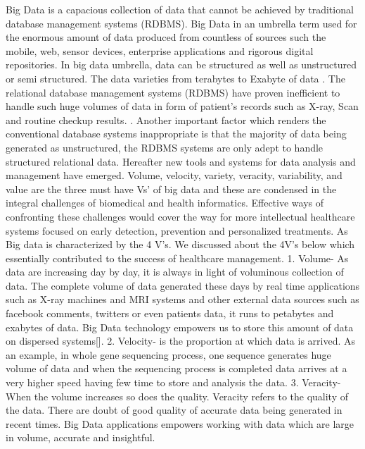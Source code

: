 \documentclass[sigconf]{acmart}
\begin{document}
Big Data is a capacious collection of data that cannot be achieved by traditional database management systems (RDBMS). Big Data in an umbrella term used for the enormous amount of data produced from countless of sources such the mobile, web, sensor devices, enterprise applications and rigorous digital repositories.  In big data umbrella, data can be structured as well as unstructured or semi structured. The data varieties from terabytes to Exabyte of data \cite{editor03}.  The relational database management systems (RDBMS) have proven inefficient to handle such huge volumes of data in form of patient’s records such as X-ray, Scan and routine checkup results. . Another important factor which renders the conventional database systems inappropriate is that the majority of data being generated as unstructured, the RDBMS systems are only adept to handle structured relational data. Hereafter new tools and systems for data analysis and management have emerged. Volume, velocity, variety, veracity, variability, and value are the three must have Vs’ of big data and these are condensed in the integral challenges of biomedical and health informatics. Effective ways of confronting these challenges would cover the way for more intellectual healthcare systems focused on early detection, prevention and personalized treatments.  As Big data is characterized by the 4 V’s. We discussed about the 4V’s below which essentially contributed to the success of healthcare management\cite{editor02}.
1. Volume- As data are increasing day by day, it is always in light of voluminous collection of data. The complete volume of data generated these days by real time applications such as X-ray machines and MRI systems and other external data sources such as facebook comments, twitters or even patients data, it runs to petabytes and exabytes of data. Big Data technology empowers us to store this amount of data on dispersed systems[\cite{editor03}].
2. Velocity- is the proportion at which data is arrived. As an example, in whole gene sequencing process, one sequence generates huge volume of data and when the sequencing process is completed data arrives at a very higher speed having few time to store and analysis the data.
3. Veracity- When the volume increases so does the quality. Veracity refers to the quality of the data. There are doubt of good quality of accurate data being generated in recent times. Big Data applications empowers working with data which are large in volume, accurate and insightful\cite{editor03}.
\end{document}
